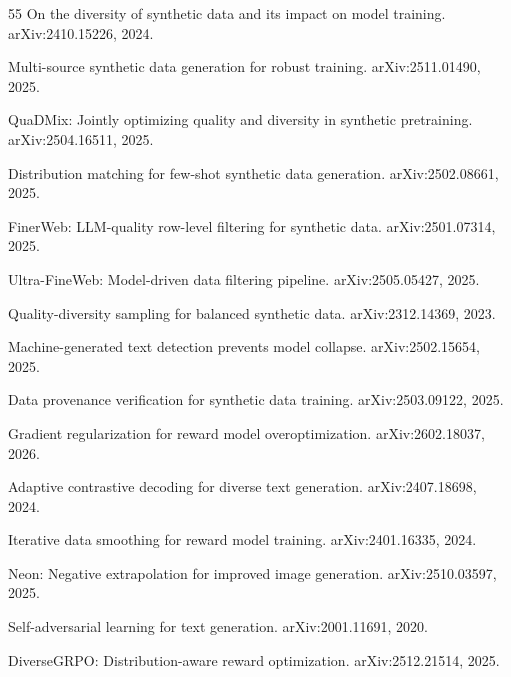\documentclass[11pt]{article}
\begin{document}
\begin{thebibliography}{55}
On the diversity of synthetic data and its impact on model training.
\newblock arXiv:2410.15226, 2024.

Multi-source synthetic data generation for robust training.
\newblock arXiv:2511.01490, 2025.

QuaDMix: Jointly optimizing quality and diversity in synthetic pretraining.
\newblock arXiv:2504.16511, 2025.

Distribution matching for few-shot synthetic data generation.
\newblock arXiv:2502.08661, 2025.

FinerWeb: LLM-quality row-level filtering for synthetic data.
\newblock arXiv:2501.07314, 2025.

Ultra-FineWeb: Model-driven data filtering pipeline.
\newblock arXiv:2505.05427, 2025.

Quality-diversity sampling for balanced synthetic data.
\newblock arXiv:2312.14369, 2023.

Machine-generated text detection prevents model collapse.
\newblock arXiv:2502.15654, 2025.

Data provenance verification for synthetic data training.
\newblock arXiv:2503.09122, 2025.

Gradient regularization for reward model overoptimization.
\newblock arXiv:2602.18037, 2026.

Adaptive contrastive decoding for diverse text generation.
\newblock arXiv:2407.18698, 2024.

Iterative data smoothing for reward model training.
\newblock arXiv:2401.16335, 2024.

Neon: Negative extrapolation for improved image generation.
\newblock arXiv:2510.03597, 2025.

Self-adversarial learning for text generation.
\newblock arXiv:2001.11691, 2020.

DiverseGRPO: Distribution-aware reward optimization.
\newblock arXiv:2512.21514, 2025.


\end{thebibliography}
\end{document}
